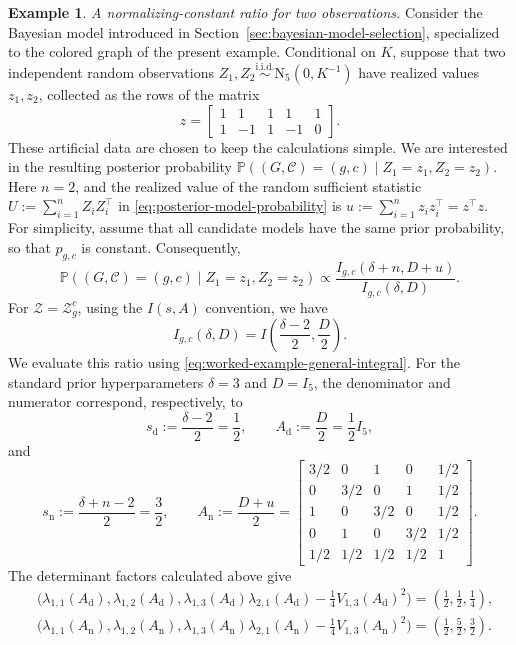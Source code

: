 \documentclass[12pt]{amsart}
\theoremstyle{plain}
\theoremstyle{definition}
\newtheorem{example}[theorem]{Example}
\theoremstyle{remark}
\renewcommand{\P}{\mathbb{P}}
\newcommand{\1}{\mathbf{1}}
\begin{document}
\begin{example}
\noindent\emph{A normalizing-constant ratio for two observations.}
Consider the Bayesian model introduced in
Section~\ref{sec:bayesian-model-selection}, specialized to the colored
graph of the present example. Conditional on $K$, suppose that two
independent random observations
$Z_1,Z_2\stackrel{\mathrm{i.i.d.}}{\sim}\mathrm{N}_5(0,K^{-1})$
have realized values $z_1,z_2$, collected as the rows of the matrix
\[
z=
\begin{bmatrix}
1&1&1&1&1\\
1&-1&1&-1&0
\end{bmatrix}.
\]
These artificial data are chosen to keep the calculations simple.
We are interested in the resulting posterior probability
$\P((G,\mathcal C)=(g,c)\mid Z_1=z_1,Z_2=z_2)$.
Here $n=2$, and the realized value of the random sufficient statistic
$U:=\sum_{i=1}^n Z_iZ_i^\top$ in
\eqref{eq:posterior-model-probability} is
$u:=\sum_{i=1}^n z_i z_i^\top=z^\top z$.
For simplicity, assume that all candidate models have the same prior
probability, so that $p_{g,c}$ is constant. Consequently,
\[
\P((G,\mathcal C)=(g,c)\mid Z_1=z_1,Z_2=z_2)
\propto
\frac{I_{g,c}(\delta+n,D+u)}{I_{g,c}(\delta,D)}.
\]
For $\mathcal Z=\mathcal Z_g^c$, using the $I(s,A)$ convention, we have
\[
I_{g,c}(\delta,D)
=I\left(\frac{\delta-2}{2},\frac D2\right).
\]
We evaluate this ratio using
\eqref{eq:worked-example-general-integral}.
For the standard prior hyperparameters $\delta=3$ and $D=I_5$,
the denominator and numerator correspond, respectively, to
\[
s_{\mathrm{d}}:=\frac{\delta-2}{2}=\frac12,
\qquad
A_{\mathrm{d}}:=\frac D2=\frac12I_5,
\]
and
\[
s_{\mathrm{n}}:=\frac{\delta+n-2}{2}=\frac32,
\qquad
A_{\mathrm{n}}:=\frac{D+u}{2}
=
\begin{bmatrix}
3/2&0&1&0&1/2\\
0&3/2&0&1&1/2\\
1&0&3/2&0&1/2\\
0&1&0&3/2&1/2\\
1/2&1/2&1/2&1/2&1
\end{bmatrix}.
\]
The determinant factors calculated above give
\[
\begin{aligned}
&\bigl(\lambda_{1,1}(A_{\mathrm{d}}),
\lambda_{1,2}(A_{\mathrm{d}}),
\lambda_{1,3}(A_{\mathrm{d}})\lambda_{2,1}(A_{\mathrm{d}})
-\tfrac14V_{1,3}(A_{\mathrm{d}})^2\bigr)
=\left(\tfrac12,\tfrac12,\tfrac14\right),\\
&\bigl(\lambda_{1,1}(A_{\mathrm{n}}),
\lambda_{1,2}(A_{\mathrm{n}}),
\lambda_{1,3}(A_{\mathrm{n}})\lambda_{2,1}(A_{\mathrm{n}})
-\tfrac14V_{1,3}(A_{\mathrm{n}})^2\bigr)
=\left(\tfrac12,\tfrac52,\tfrac32\right).

\end{aligned}\]
\end{example}
\end{document}
